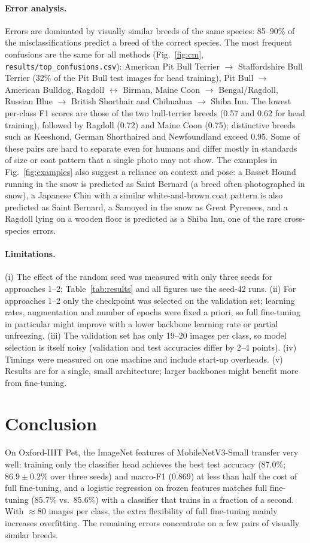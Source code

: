 \documentclass[11pt,a4paper]{article}
\begin{document}
\paragraph{Error analysis.} Errors are dominated by visually similar breeds of the same
species: 85--90\% of the misclassifications predict a breed of the correct species. The most
frequent confusions are the same for all methods (Fig.~\ref{fig:cm},
\texttt{results/top\_confusions.csv}): American Pit Bull Terrier $\to$ Staffordshire Bull
Terrier (32\% of the Pit Bull test images for head training), Pit Bull $\to$ American
Bulldog, Ragdoll $\leftrightarrow$ Birman, Maine Coon $\to$ Bengal/Ragdoll, Russian Blue
$\to$ British Shorthair and Chihuahua $\to$ Shiba Inu. The lowest per-class F1 scores are
those of the two bull-terrier breeds (0.57 and 0.62 for head training), followed by Ragdoll
(0.72) and Maine Coon (0.75); distinctive breeds such as Keeshond, German Shorthaired and
Newfoundland exceed 0.95. Some of these pairs are hard to separate even for humans and differ
mostly in standards of size or coat pattern that a single photo may not show. The examples in
Fig.~\ref{fig:examples} also suggest a reliance on context and pose: a Basset Hound running in the snow is predicted as Saint Bernard (a breed often photographed
in snow), a Japanese Chin with a similar white-and-brown coat pattern is also predicted as Saint
Bernard, a Samoyed in the snow as Great Pyrenees, and a Ragdoll lying on a wooden floor is predicted as a Shiba
Inu, one of the rare cross-species errors.

\paragraph{Limitations.} (i) The effect of the random seed was measured with only three seeds
for approaches 1--2; Table~\ref{tab:results} and all figures use the seed-42 runs. (ii) For approaches 1--2 only the checkpoint was selected on the
validation set; learning rates, augmentation and number of epochs were fixed a priori, so
full fine-tuning in particular might improve with a lower backbone learning rate or partial
unfreezing. (iii) The validation set has only 19--20 images per class, so model selection is
itself noisy (validation and test accuracies differ by 2--4 points). (iv) Timings were
measured on one machine and include start-up overheads. (v) Results are for a single, small
architecture; larger backbones might benefit more from fine-tuning.

\section{Conclusion}
On Oxford-IIIT Pet, the ImageNet features of MobileNetV3-Small transfer very well: training
only the classifier head achieves the best test accuracy (87.0\%; $86.9\pm0.2\%$ over three seeds) and macro-F1 (0.869) at less
than half the cost of full fine-tuning, and a logistic regression on frozen features matches full
fine-tuning (85.7\% vs.\ 85.6\%) with a classifier that trains in a fraction of a second. With
${\approx}80$ images per class, the extra flexibility of full fine-tuning mainly increases
overfitting. The remaining errors concentrate on a few pairs of visually similar breeds.
\end{document}
